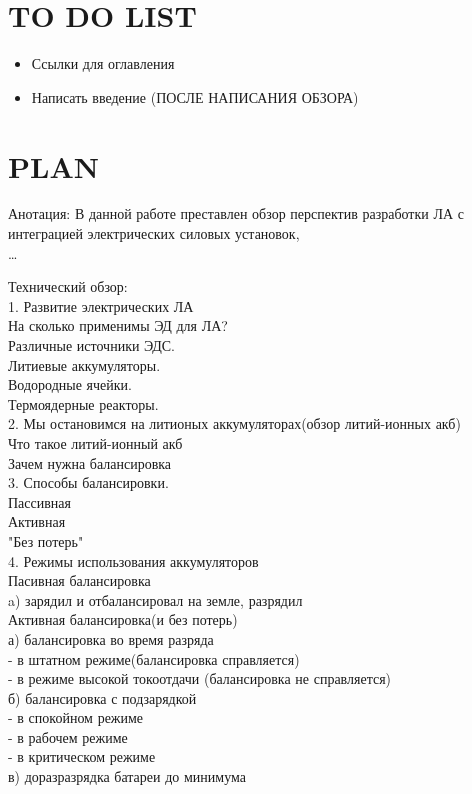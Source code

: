 
\section{TO DO LIST}

\begin{itemize}
    \item [*] Ссылки для оглавления
    \item [*] Написать введение (ПОСЛЕ НАПИСАНИЯ ОБЗОРА)
\end{itemize}


\section{PLAN}

Анотация:
В данной работе преставлен обзор перспектив разработки ЛА с интеграцией электрических силовых установок, \\
\dots

Технический обзор:  \\
1. Развитие электрических ЛА  \\
    На сколько применимы ЭД для ЛА?  \\
    Различные источники ЭДС.  \\
    Литиевые аккумуляторы.  \\
    Водородные ячейки.  \\
    Термоядерные реакторы.  \\
2. Мы остановимся на литионых аккумуляторах(обзор литий-ионных акб)  \\
    Что такое литий-ионный акб  \\
    Зачем нужна балансировка  \\
3. Способы балансировки. \\
    Пассивная\\
    Активная\\
    "Без потерь"\\
4. Режимы использования аккумуляторов \\ 
    Пасивная балансировка \\
        a) зарядил и отбалансировал на земле, разрядил \\
    Активная балансировка(и без потерь) \\
        а) балансировка во время разряда \\
            - в штатном режиме(балансировка справляется) \\
            - в режиме высокой токоотдачи (балансировка не справляется) \\
        б) балансировка с подзарядкой \\
            - в спокойном режиме \\
            - в рабочем режиме  \\
            - в критическом режиме \\
        в) доразразрядка батареи до минимума \\

